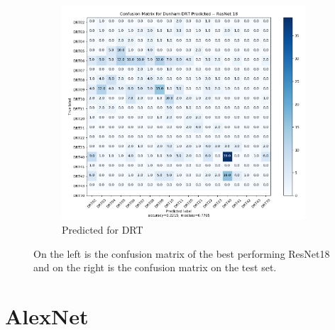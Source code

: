 \begin{figure}
\begin{subfigure}{.5\textwidth}
  \includegraphics[width=.8\linewidth]{figures/04-drt_predicted.PNG}
  \caption{Predicted for DRT}
  \label{fig:rescmpred_drt}
\end{subfigure}
\caption{On the left is the confusion matrix of the best performing ResNet18 and on the right is the confusion matrix on the test set.}
\label{fig:rescms}
\end{figure}



\section{AlexNet}\label{sec:aleX}
